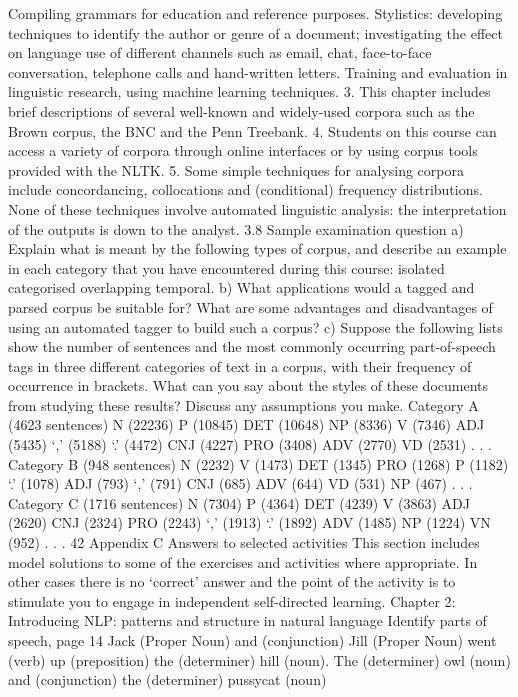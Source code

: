 Compiling grammars for education and reference purposes.
Stylistics: developing techniques to identify the author or genre of a
document; investigating the effect on language use of different channels
such as email, chat, face-to-face conversation, telephone calls and
hand-written letters.
Training and evaluation in linguistic research, using machine learning
techniques.
3. This chapter includes brief descriptions of several well-known and widely-used
corpora such as the Brown corpus, the BNC and the Penn Treebank.
4. Students on this course can access a variety of corpora through online interfaces
or by using corpus tools provided with the NLTK.
5. Some simple techniques for analysing corpora include concordancing,
collocations and (conditional) frequency distributions. None of these techniques
involve automated linguistic analysis: the interpretation of the outputs is down
to the analyst.
3.8 Sample examination question
a) Explain what is meant by the following types of corpus, and describe an example
in each category that you have encountered during this course:
isolated
categorised
overlapping
temporal.
b) What applications would a tagged and parsed corpus be suitable for? What are
some advantages and disadvantages of using an automated tagger to build such a
corpus?
c) Suppose the following lists show the number of sentences and the most commonly
occurring part-of-speech tags in three different categories of text in a corpus, with
their frequency of occurrence in brackets. What can you say about the styles of these
documents from studying these results? Discuss any assumptions you make.
Category A (4623 sentences) N (22236) P (10845) DET (10648) NP (8336) V
(7346) ADJ (5435) ‘,’ (5188) ‘.’ (4472) CNJ (4227) PRO (3408) ADV (2770) VD
(2531) . . .
Category B (948 sentences) N (2232) V (1473) DET (1345) PRO (1268) P (1182)
‘.’ (1078) ADJ (793) ‘,’ (791) CNJ (685) ADV (644) VD (531) NP (467) . . .
Category C (1716 sentences) N (7304) P (4364) DET (4239) V (3863) ADJ (2620)
CNJ (2324) PRO (2243) ‘,’ (1913) ‘.’ (1892) ADV (1485) NP (1224) VN (952)
. . .
42
Appendix C
Answers to selected activities
This section includes model solutions to some of the exercises and activities where
appropriate. In other cases there is no ‘correct’ answer and the point of the activity is
to stimulate you to engage in independent self-directed learning.
Chapter 2: Introducing NLP: patterns and structure in natural
language
Identify parts of speech, page 14
Jack (Proper Noun) and (conjunction) Jill (Proper Noun) went (verb) up
(preposition) the (determiner) hill (noun).
The (determiner) owl (noun) and (conjunction) the (determiner) pussycat (noun)
